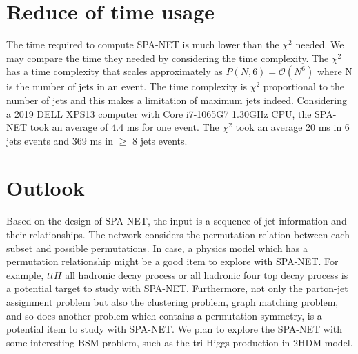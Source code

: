 \section{Reduce of time usage}\label{sec: reduce of time uasge}
The time required to compute SPA-NET is much lower than the $\chi^{2}$ needed. We may compare the time they needed by considering the time complexity. The $\chi^{2}$ has a time complexity that scales approximately as $P(N,6)=\mathcal{O}(N^{6})$ where N is the number of jets in an event. The time complexity is $\chi^{2}$ proportional to the number of jets and this makes a limitation of maximum jets indeed. Considering a 2019 DELL XPS13 computer with Core i7-1065G7 1.30GHz CPU, the SPA-NET took an average of 4.4 ms for one event.  The $\chi^{2}$ took an average 20 ms in 6 jets events and 369 ms in $\ge$ 8 jets events. 
\section{Outlook}\label{sec:outlook}
Based on the design of SPA-NET, the input is a sequence of jet information and their relationships. The network considers the permutation relation between each subset and possible permutations. In case, a physics model which has a permutation relationship might be a good item to explore with SPA-NET. For example, $ttH$ all hadronic decay process or all hadronic four top decay process is a potential target to study with SPA-NET. Furthermore, not only the parton-jet assignment problem but also the clustering problem, graph matching problem, and so does another problem which contains a permutation symmetry, is a potential item to study with SPA-NET. We plan to explore the SPA-NET with some interesting BSM problem, such as the tri-Higgs production in 2HDM model.\cite{Low:2020iua}



